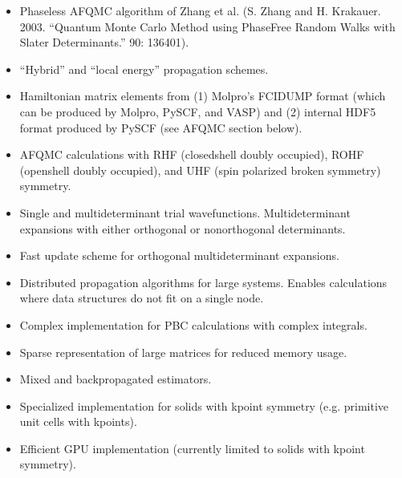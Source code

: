 \documentclass[letterpaper,10pt,english]{sphinxmanual}
\begin{document}
\begin{itemize}
\item {} 
Phaseless AFQMC algorithm of Zhang et al. (S. Zhang and H. Krakauer.
2003. “Quantum Monte Carlo Method using Phase\sphinxhyphen{}Free Random Walks with
Slater Determinants.”  90: 136401).

\item {} 
“Hybrid” and “local energy” propagation schemes.

\item {} 
Hamiltonian matrix elements from (1) Molpro’s FCIDUMP format (which
can be produced by Molpro, PySCF, and VASP) and (2) internal HDF5
format produced by PySCF (see AFQMC section below).

\item {} 
AFQMC calculations with RHF (closed\sphinxhyphen{}shell doubly occupied), ROHF
(open\sphinxhyphen{}shell doubly occupied), and UHF (spin polarized broken
symmetry) symmetry.

\item {} 
Single and multideterminant trial wavefunctions. Multideterminant
expansions with either orthogonal or nonorthogonal determinants.

\item {} 
Fast update scheme for orthogonal multideterminant expansions.

\item {} 
Distributed propagation algorithms for large systems. Enables
calculations where data structures do not fit on a single node.

\item {} 
Complex implementation for PBC calculations with complex integrals.

\item {} 
Sparse representation of large matrices for reduced memory usage.

\item {} 
Mixed and back\sphinxhyphen{}propagated estimators.

\item {} 
Specialized implementation for solids with k\sphinxhyphen{}point symmetry (e.g.
primitive unit cells with kpoints).

\item {} 
Efficient GPU implementation (currently limited to solids with
k\sphinxhyphen{}point symmetry).

\end{itemize}
\end{document}
